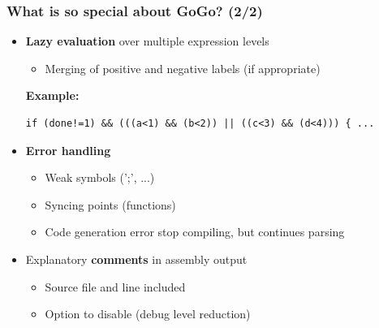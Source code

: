 \documentclass{beamer}
\begin{document}

\begin{frame}[containsverbatim]
    \frametitle{What is so special about GoGo? (2/2)}
    \begin{itemize}
        \item \textbf{Lazy evaluation} over multiple expression levels\\
            \begin{itemize}
                \item Merging of positive and negative labels (if appropriate)
            \end{itemize} 
            \tiny \textbf{Example:} \normalsize
            \begin{lstlisting}
if (done!=1) && (((a<1) && (b<2)) || ((c<3) && (d<4))) { ...
            \end{lstlisting}
        \item \textbf{Error handling}
            \begin{itemize}
                \item Weak symbols (';', ...)
                \item Syncing points (functions)
                \item Code generation error stop compiling, but continues parsing
            \end{itemize}
        \item  Explanatory \textbf{comments} in assembly output\\
            \begin{itemize}
                \item Source file and line included
                \item Option to disable (debug level reduction)
            \end{itemize}
    \end{itemize}
\end{frame}
\end{document}
